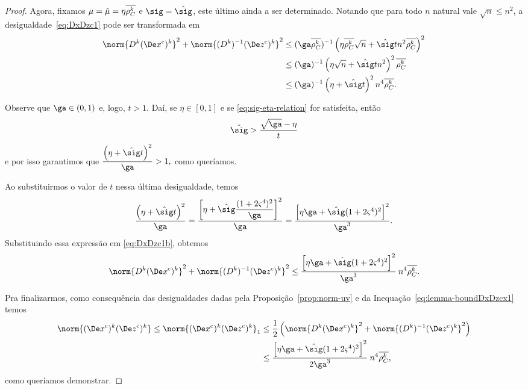 \begin{proof}
Agora, fixamos $\mu = \hat{\mu} =\eta \overline{\rho_C^{k}} $ e $\sig = \nextsig$, este último ainda a ser determinado. Notando que para todo $n$ natural vale $\sqrt{n} \leq n^{2}$, a desigualdade~\eqref{eq:DxDzc1} pode ser transformada em
\begin{align}
	\norm{\Dk\Dekcox}^{2} + \norm{\Dik\Dekcoz}^{2}
							& \leq (\ga\rhoCkb )^{-1}\left(\eta\rhoCkb \sqrt{n} +{\nextsig} t n^{2}\rhoCkb \right)^{2} \notag \\
							& \leq (\ga)^{-1}\left(\eta\sqrt{n} +{\nextsig} t n^{2}\right)^{2}\rhoCkb \notag \\
							& \leq (\ga)^{-1}\left(\eta +{\nextsig} t \right)^{2}n^{4}\rhoCkb . \label{eq:DxDzc1b}	
\end{align}



Observe que $\ga\in(0,1)$ e, logo, $t > 1$.  Daí, se $\eta\in[0,1]$ e   se \eqref{eq:sig-eta-relation} for satisfeita, então 
\[
\nextsig > \dfrac{\sqrt{\ga} - \eta}{t}
\]
e por isso garantimos que 
$
	\dfrac{\left(\eta +{\nextsig} t \right)^{2}}{\ga} >1,
$
como queríamos.

Ao substituirmos o valor de $t$ nessa última desigualdade, temos 
\[
	\dfrac{\left(\eta +{\nextsig} t \right)^{2}}{\ga} = \dfrac{\left[\eta + \nextsig\dfrac{(1+2\bdxzstar^{4})^{2}}{\ga}\right]^{2}}{\ga} = \dfrac{\left[\eta\ga + \nextsig(1+2\bdxzstar^{4})^{2}\right]^{2}}{\ga^{3}}.
\] 
Substituindo essa expressão em 	\eqref{eq:DxDzc1b}, obtemos
\begin{equation}\label{eq:lemma-boundDxDzcx1}
		\norm{\Dk\Dekcox}^{2} + \norm{\Dik\Dekcoz}^{2} \leq \dfrac{\left[\eta\ga + \nextsig(1+2\bdxzstar^{4})^{2}\right]^{2}}{\ga^{3}} \: n^{4}\rhoCkb.
	\end{equation}

Pra finalizarmos, como consequência  das desigualdades dadas pela Proposição~\ref{prop:norm-uv} e da Inequação~\eqref{eq:lemma-boundDxDzcx1} temos
\[
\begin{aligned}  				 
	\norm{ \Dekcox  \Dekcoz  } \leq \norm{ \Dekcox  \Dekcoz  }_{1}   & \leq \frac{1}{2}\left(\norm{\Dk \Dekcox}^{2} + \norm{\Dik  \Dekcoz  }^{2}\right) \notag
  					\\ 
  					& \leq \dfrac{\left[\eta\ga + \nextsig(1+2\bdxzstar^{4})^{2}\right]^{2}}{2\ga^{3}} \: n^{4}\rhoCkb,
\end{aligned}
\]
como queríamos demonstrar.
\end{proof}

